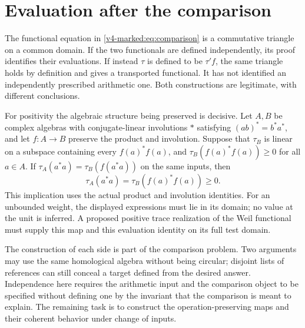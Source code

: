 \section{Evaluation after the comparison}
\label{v4-marked:sec:evaluation}

The functional equation in \eqref{v4-marked:eq:comparison} is a
commutative triangle on a common domain. If the two functionals are
defined independently, its proof identifies their evaluations.
If instead \(\tau\) is defined to be \(\tau'f\), the same
triangle holds by definition and gives a transported functional.
It has not identified an independently prescribed arithmetic one.
Both constructions are legitimate, with different conclusions.

For positivity the algebraic structure being preserved is decisive.
Let \(A,B\) be complex algebras with conjugate-linear involutions
\(*\) satisfying \((ab)^*=b^*a^*\), and let
\(f:A\to B\) preserve the product and involution. Suppose that
\(\tau_B\) is linear on a subspace containing every
\(f(a)^*f(a)\), and
\(\tau_B(f(a)^*f(a))\ge0\) for all \(a\in A\).
If \(\tau_A(a^*a)=\tau_B(f(a^*a))\) on the same inputs, then
\[
 \tau_A(a^*a)=\tau_B(f(a)^*f(a))\ge0.
\]
This implication uses the actual product and involution identities.
For an unbounded weight, the displayed expressions must lie in its
domain; no value at the unit is inferred. A proposed positive trace
realization of the Weil functional must supply this map and this
evaluation identity on its full test domain.

The construction of each side is part of the comparison problem.
Two arguments may use the same homological algebra without being
circular; disjoint lists of references can still conceal a target
defined from the desired answer. Independence here requires the
arithmetic input and the comparison object to be specified without
defining one by the invariant that the comparison is meant to
explain. The remaining task is to construct the operation-preserving
maps and their coherent behavior under change of inputs.
